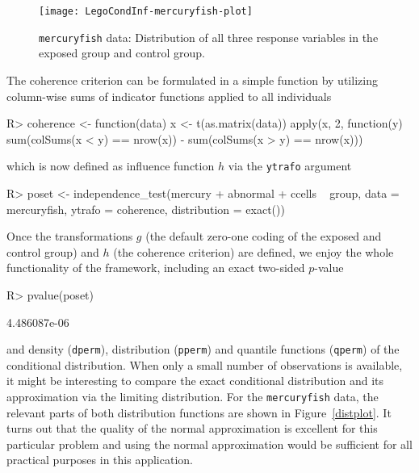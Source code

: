 \documentclass{article}
\newcommand{\Robject}[1]{\texttt{#1}}
\newcommand{\Rcmd}[1]{\texttt{#1}}
\newenvironment{Schunk}{}{}
\begin{document}
\begin{sidewaysfigure}
\begin{center}
\texttt{[image: LegoCondInf-mercuryfish-plot]}
\caption{\Robject{mercuryfish} data: 
         Distribution of all three response variables in the exposed group
         and control group. \label{mercurybox}}
\end{center}
\end{sidewaysfigure}
The coherence criterion can be formulated in a simple function by utilizing 
column-wise sums of indicator functions applied to all individuals
\begin{Schunk}
\begin{Sinput}
R> coherence <- function(data) {
       x <- t(as.matrix(data))
       apply(x, 2, function(y) sum(colSums(x < y) == 
           nrow(x)) - sum(colSums(x > y) == nrow(x)))
   }
\end{Sinput}
\end{Schunk}
which is now defined as influence function $h$ via the \Rcmd{ytrafo} argument
\begin{Schunk}
\begin{Sinput}
R> poset <- independence_test(mercury + abnormal + ccells ~ 
       group, data = mercuryfish, ytrafo = coherence, 
       distribution = exact())
\end{Sinput}
\end{Schunk}
Once the transformations $g$ (the default zero-one coding of the exposed and control
group) and $h$ (the coherence criterion) are defined, we enjoy the whole
functionality of the framework, including an exact two-sided $p$-value
\begin{Schunk}
\begin{Sinput}
R> pvalue(poset)
\end{Sinput}
\begin{Soutput}
[1] 4.486087e-06
\end{Soutput}
\end{Schunk}
and density (\Rcmd{dperm}), distribution (\Rcmd{pperm}) and quantile functions 
(\Rcmd{qperm}) of the conditional distribution. When only a small number of
observations is available, it might be interesting to compare the exact
conditional distribution and its approximation via the limiting distribution.
For the \Robject{mercuryfish} data, the relevant parts of 
both distribution functions are shown in Figure~\ref{distplot}. It 
turns out that the quality of the normal approximation is excellent for this
particular problem and using the normal approximation would be sufficient 
for all practical purposes in this application.
\end{document}

